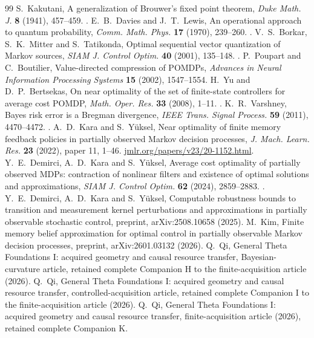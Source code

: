 \begin{thebibliography}{99}
 S.~Kakutani, A generalization of Brouwer's fixed point theorem, \emph{Duke Math. J.} \textbf{8} (1941), 457--459. .
 E.~B.~Davies and J.~T.~Lewis, An operational approach to quantum probability, \emph{Comm. Math. Phys.} \textbf{17} (1970), 239--260. .
 V.~S.~Borkar, S.~K.~Mitter and S.~Tatikonda, Optimal sequential vector quantization of Markov sources, \emph{SIAM J. Control Optim.} \textbf{40} (2001), 135--148. .
 P.~Poupart and C.~Boutilier, Value-directed compression of POMDPs, \emph{Advances in Neural Information Processing Systems} \textbf{15} (2002), 1547--1554.
 H.~Yu and D.~P.~Bertsekas, On near optimality of the set of finite-state controllers for average cost POMDP, \emph{Math. Oper. Res.} \textbf{33} (2008), 1--11. .
 K.~R.~Varshney, Bayes risk error is a Bregman divergence, \emph{IEEE Trans. Signal Process.} \textbf{59} (2011), 4470--4472. .
 A.~D.~Kara and S.~Y\"uksel, Near optimality of finite memory feedback policies in partially observed Markov decision processes, \emph{J. Mach. Learn. Res.} \textbf{23} (2022), paper 11, 1--46. \href{https://jmlr.org/papers/v23/20-1152.html}{jmlr.org/papers/v23/20-1152.html}.
 Y.~E.~Demirci, A.~D.~Kara and S.~Y\"uksel, Average cost optimality of partially observed MDPs: contraction of nonlinear filters and existence of optimal solutions and approximations, \emph{SIAM J. Control Optim.} \textbf{62} (2024), 2859--2883. .
 Y.~E.~Demirci, A.~D.~Kara and S.~Y\"uksel, Computable robustness bounds to transition and measurement kernel perturbations and approximations in partially observable stochastic control, preprint, arXiv:2508.10658 (2025).
 M.~Kim, Finite memory belief approximation for optimal control in partially observable Markov decision processes, preprint, arXiv:2601.03132 (2026).
 Q.~Qi, General Theta Foundations I: acquired geometry and causal resource transfer, Bayesian-curvature article, retained complete Companion H to the finite-acquisition article (2026).
 Q.~Qi, General Theta Foundations I: acquired geometry and causal resource transfer, controlled-acquisition article, retained complete Companion I to the finite-acquisition article (2026).
 Q.~Qi, General Theta Foundations I: acquired geometry and causal resource transfer, finite-acquisition article (2026), retained complete Companion K.
\end{thebibliography}

